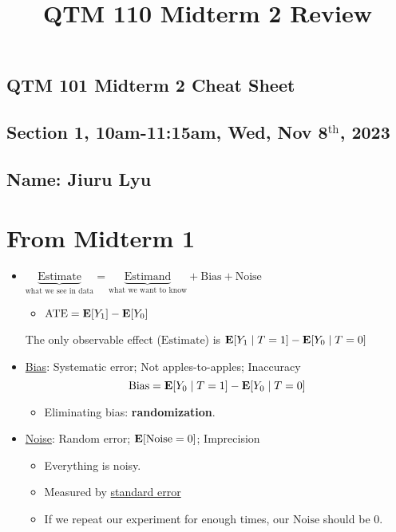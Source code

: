 \documentclass[10pt, letterpaper]{article}
\title{\textbf{QTM 110 Midterm 2 Review}}
\def\E{\vb{E}}
\def\ATE{\mathrm{ATE}}
\def\Bias{\mathrm{Bias}}
\begin{document}
\newpage
\begin{multicols}{2}
\thispagestyle{plain}

\subsection*{QTM 101 Midterm 2 Cheat Sheet}
\subsection*{Section 1, 10am-11:15am, Wed, Nov 8$^\text{th}$, 2023}
\subsection*{Name: Jiuru Lyu}

\section*{From Midterm 1}
\begin{itemize}
\item $\underbrace{\boxed{\textrm{Estimate}}}_\text{what we see in data}=\underbrace{\boxed{\textrm{Estimand}}}_\text{what we want to know}+\textrm{Bias}+\textrm{Noise}$
	\begin{itemize}
		\item $\ATE=\E[Y_1]-\E[Y_0]$
	\end{itemize}
	The only observable effect ($\mathrm{Estimate}$) is $\E\qty[Y_1\mid T=1]-\E\qty[Y_0\mid T=0]$
\item \underline{Bias}: Systematic error; Not apples-to-apples; Inaccuracy \[\Bias=\E[Y_0\mid T=1]-\E[Y_0\mid T=0]\]
	\begin{itemize}
		\item Eliminating bias: \textbf{randomization}.
	\end{itemize}
\item \underline{Noise}: Random error; $\E\qty[\mathrm{Noise}=0]$; Imprecision
	\begin{itemize}
		\item Everything is noisy.
		\item Measured by \underline{standard error}
		\item If we repeat our experiment for enough times, our $\mathrm{Noise}$ should be $0$.
	\end{itemize}
\end{itemize}


\end{multicols}
\end{document}
